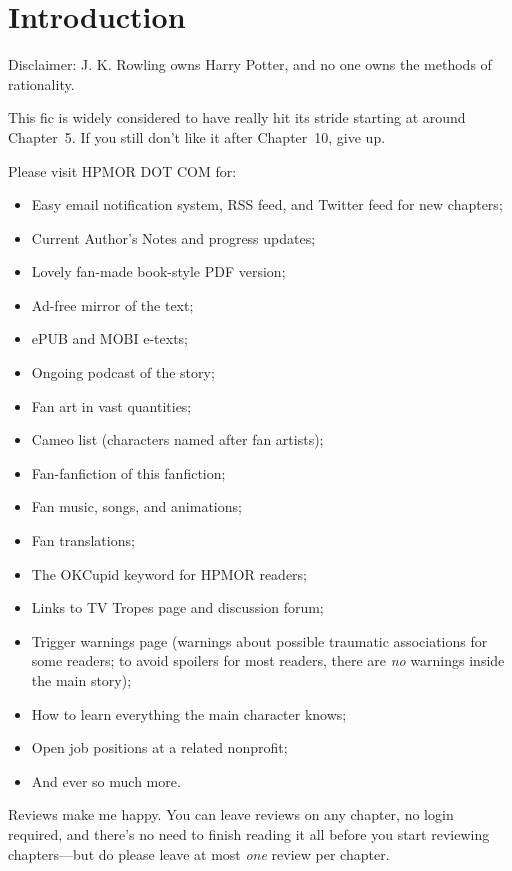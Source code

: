 \chapter{Introduction}
Disclaimer: J. K. Rowling owns Harry Potter, and no one owns the methods of
rationality.

This fic is widely considered to have really hit its stride starting at around
Chapter~5. If you still don't like it after Chapter~10, give up.

\SmallVSpace
Please visit HPMOR DOT COM for:

\SmallVSpace
\begin{itemize}
    \item Easy email notification system, RSS feed, and Twitter feed for new chapters;
    \item Current Author's Notes and progress updates;
    \item Lovely fan-made book-style PDF version;
    \item Ad-free mirror of the text;
    \item ePUB and MOBI e-texts;
    \item Ongoing podcast of the story;
    \item Fan art in vast quantities;
    \item Cameo list (characters named after fan artists);
    \item Fan-fanfiction of this fanfiction;
    \item Fan music, songs, and animations;
    \item Fan translations;
    \item The OKCupid keyword for HPMOR readers;
    \item Links to TV Tropes page and discussion forum;
    \item Trigger warnings page (warnings about possible traumatic associations
        for some readers; to avoid spoilers for most readers, there are
        \emph{no} warnings inside the main story);
    \item How to learn everything the main character knows;
    \item Open job positions at a related nonprofit;
    \item And ever so much more.
\end{itemize}

\SmallVSpace
Reviews make me happy. You can leave reviews on any chapter, no login required,
and there's no need to finish reading it all before you start reviewing
chapters---but do please leave at most \emph{one} review per chapter.

